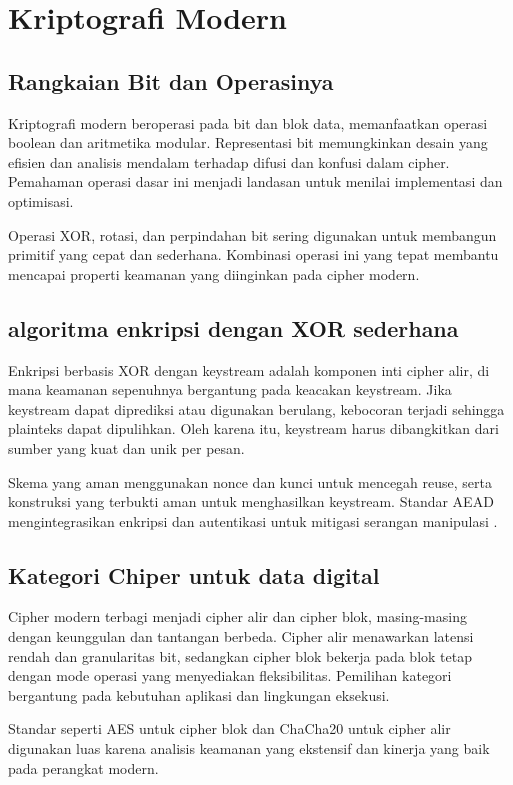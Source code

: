 \documentclass[../main.tex]{subfiles}
\begin{document}
\chapter{Kriptografi Modern}

\section{Rangkaian Bit dan Operasinya}
Kriptografi modern beroperasi pada bit dan blok data, memanfaatkan operasi boolean dan aritmetika modular. Representasi bit memungkinkan desain yang efisien dan analisis mendalam terhadap difusi dan konfusi dalam cipher. Pemahaman operasi dasar ini menjadi landasan untuk menilai implementasi dan optimisasi.

Operasi XOR, rotasi, dan perpindahan bit sering digunakan untuk membangun primitif yang cepat dan sederhana. Kombinasi operasi ini yang tepat membantu mencapai properti keamanan yang diinginkan pada cipher modern.

\section{algoritma enkripsi dengan XOR sederhana}
Enkripsi berbasis XOR dengan keystream adalah komponen inti cipher alir, di mana keamanan sepenuhnya bergantung pada keacakan keystream. Jika keystream dapat diprediksi atau digunakan berulang, kebocoran terjadi sehingga plainteks dapat dipulihkan. Oleh karena itu, keystream harus dibangkitkan dari sumber yang kuat dan unik per pesan.

Skema yang aman menggunakan nonce dan kunci untuk mencegah reuse, serta konstruksi yang terbukti aman untuk menghasilkan keystream. Standar AEAD mengintegrasikan enkripsi dan autentikasi untuk mitigasi serangan manipulasi \parencite{rfc5116}.

\section{Kategori Chiper untuk data digital}
Cipher modern terbagi menjadi cipher alir dan cipher blok, masing-masing dengan keunggulan dan tantangan berbeda. Cipher alir menawarkan latensi rendah dan granularitas bit, sedangkan cipher blok bekerja pada blok tetap dengan mode operasi yang menyediakan fleksibilitas. Pemilihan kategori bergantung pada kebutuhan aplikasi dan lingkungan eksekusi.

Standar seperti AES untuk cipher blok dan ChaCha20 untuk cipher alir digunakan luas karena analisis keamanan yang ekstensif dan kinerja yang baik pada perangkat modern.
\end{document}
